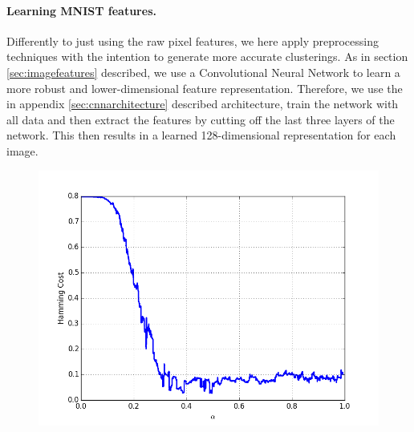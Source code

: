 \paragraph{Learning MNIST features.} Differently to just using the raw pixel features, we here apply preprocessing techniques with the intention to generate more accurate clusterings. As in section \ref{sec:imagefeatures} described, we use a Convolutional Neural Network to learn a more robust and lower-dimensional feature representation. Therefore, we use the in appendix \ref{sec:cnnarchitecture} described architecture, train the network with all data and then extract the features by cutting off the last three layers of the network. This then results in a learned 128-dimensional representation for each image.

\begin{figure}[h]
\centering
\begin{minipage}{.45\textwidth}
  \centering
  {\includegraphics[width=\linewidth]{plots/mnist-cnn-avg}}
\end{minipage}\quad
\begin{minipage}{.45\textwidth}
  \centering

\end{minipage}
\end{figure}

